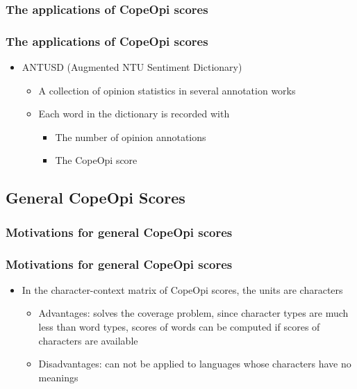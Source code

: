 \documentclass[mathserif]{beamer}
\begin{document}
\subsubsection{The applications of CopeOpi scores}
\begin{frame}
\frametitle{The applications of CopeOpi scores}
\begin{itemize}
\item ANTUSD (Augmented NTU Sentiment Dictionary)\cite{Wang2006antusd}
	\begin{itemize}
	\item A collection of opinion statistics in several annotation works
	\item Each word in the dictionary is recorded with
		\begin{itemize}
		\item The number of opinion annotations
		\item The CopeOpi score
		\end{itemize}
	\end{itemize}
\end{itemize}
\end{frame}
\subsection{General CopeOpi Scores}
\subsubsection{Motivations for general CopeOpi scores}
\begin{frame}
\frametitle{Motivations for general CopeOpi scores}
\begin{itemize}
\item In the character-context matrix of CopeOpi scores, the units are characters
	\begin{itemize}
	\item Advantages: solves the coverage problem, since character types are much less than word types, scores of words can be computed if scores of characters are available 
	\item Disadvantages: can not be applied to languages whose characters have no meanings
	\end{itemize}
\end{itemize}
\begin{flushright}
\end{flushright}
\end{frame}
\end{document}
